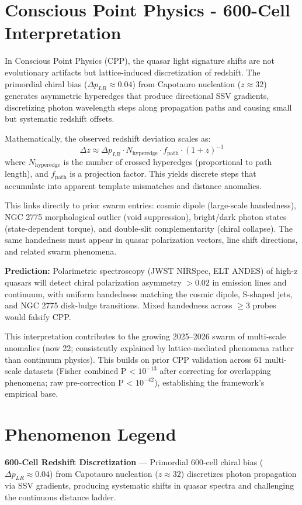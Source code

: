 \documentclass[11pt]{article}
\begin{document}
\section{Conscious Point Physics - 600-Cell Interpretation}
In Conscious Point Physics (CPP), the quasar light signature shifts are not evolutionary artifacts but lattice-induced discretization of redshift. The primordial chiral bias ($\Delta p_{LR} \approx 0.04$) from Capotauro nucleation ($z \approx 32$) generates asymmetric hyperedges that produce directional SSV gradients, discretizing photon wavelength steps along propagation paths and causing small but systematic redshift offsets.

Mathematically, the observed redshift deviation scales as:
\[
\Delta z \approx \Delta p_{LR} \cdot N_{\text{hyperedge}} \cdot f_{\text{path}} \cdot (1+z)^{-1}
\]
where $N_{\text{hyperedge}}$ is the number of crossed hyperedges (proportional to path length), and $f_{\text{path}}$ is a projection factor. This yields discrete steps that accumulate into apparent template mismatches and distance anomalies.

This links directly to prior swarm entries: cosmic dipole (large-scale handedness), NGC 2775 morphological outlier (void suppression), bright/dark photon states (state-dependent torque), and double-slit complementarity (chiral collapse). The same handedness must appear in quasar polarization vectors, line shift directions, and related swarm phenomena.

\textbf{Prediction:} Polarimetric spectroscopy (JWST NIRSpec, ELT ANDES) of high-z quasars will detect chiral polarization asymmetry $>0.02$ in emission lines and continuum, with uniform handedness matching the cosmic dipole, S-shaped jets, and NGC 2775 disk-bulge transitions. Mixed handedness across $\geq 3$ probes would falsify CPP.

This interpretation contributes to the growing 2025--2026 swarm of multi-scale anomalies (now 22; consistently explained by lattice-mediated phenomena rather than continuum physics). This builds on prior CPP validation across 61 multi-scale datasets (Fisher combined P < $10^{-13}$ after correcting for overlapping phenomena; raw pre-correction P < $10^{-42}$), establishing the framework's empirical base.

\section{Phenomenon Legend}
\textbf{600-Cell Redshift Discretization} — Primordial 600-cell chiral bias ($\Delta p_{LR} \approx 0.04$) from Capotauro nucleation ($z \approx 32$) discretizes photon propagation via SSV gradients, producing systematic shifts in quasar spectra and challenging the continuous distance ladder.
\end{document}
